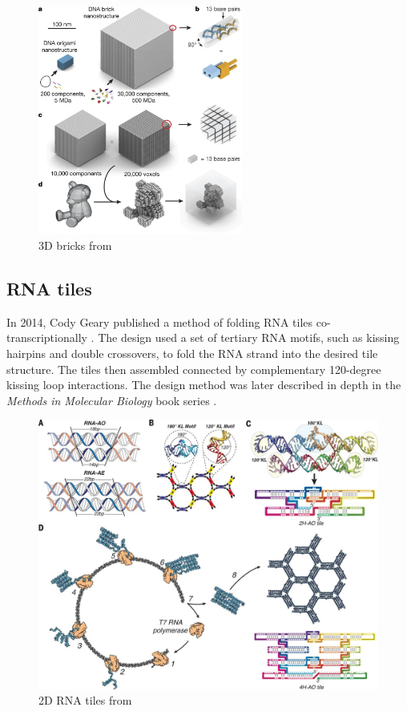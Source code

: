 
\begin{figure}[h]
  \centering\includegraphics[width=0.6\textwidth]{figures/dna_bricks.png}
  \caption{3D bricks from \cite{ong2017programmable}}
  \label{fig:dna_tiles}
\end{figure}

\subsection{RNA tiles}
In 2014, Cody Geary published a method of folding RNA tiles co-transcriptionally \cite{geary2014single}. The design used a set of tertiary RNA motifs, such as kissing hairpins and double crossovers, to fold the RNA strand into the desired tile structure. The tiles then assembled connected by complementary 120-degree kissing loop interactions. The design method was later described in depth in the \emph{Methods in Molecular Biology} book series \cite{sparvath2017computer}.

\begin{figure}[h]
  \centering\includegraphics[width=\textwidth]{figures/rna_tiles.jpeg}
  \caption{2D RNA tiles from \cite{geary2014single}}
  \label{fig:rna_tiles}
\end{figure}

